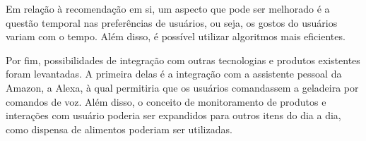 Em relação à recomendação em si, um aspecto que pode ser melhorado é a questão temporal nas preferências de usuários, ou seja, os gostos do usuários variam com o tempo. Além disso, é possível utilizar algoritmos mais eficientes.

Por fim, possibilidades de integração com outras tecnologias e produtos existentes foram levantadas. A primeira delas é a integração com a assistente pessoal da Amazon\textsuperscript{\textregistered}, a Alexa\textsuperscript{\textregistered}, à qual permitiria que os usuários comandassem a geladeira por comandos de voz. Além disso, o conceito de monitoramento de produtos e interações com usuário poderia ser expandidos para outros itens do dia a dia, como dispensa de alimentos poderiam ser utilizadas. 












